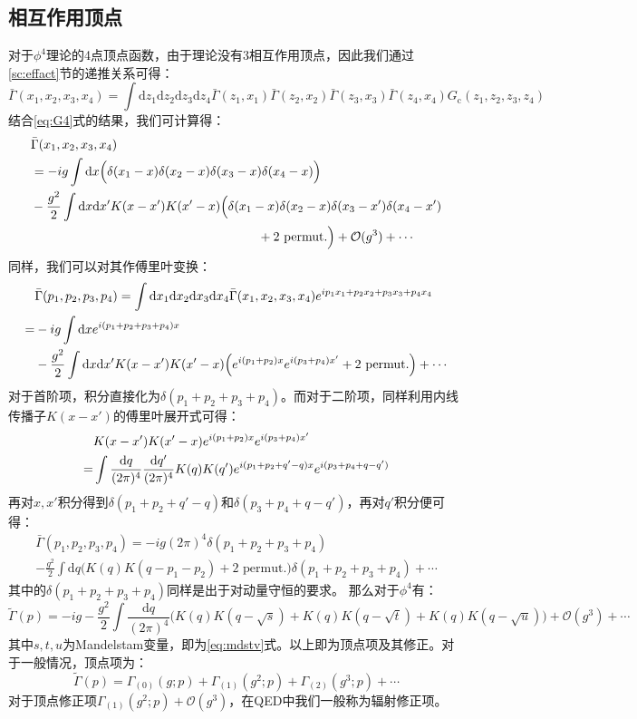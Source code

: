 \subsection{相互作用顶点}
对于$\phi^4$理论的4点顶点函数，由于理论没有3相互作用顶点，因此我们通过\ref{sc:effact}节的递推关系可得：
\begin{equation}
\bar{\Gamma}(x_1,x_2,x_3,x_4)=\int\mathrm{d}z_1\mathrm{d}z_2\mathrm{d}z_3\mathrm{d}z_4\bar{\Gamma}(z_1,x_1)\bar{\Gamma}(z_2,x_2)\bar{\Gamma}(z_3,x_3)\bar{\Gamma}(z_4,x_4)G_{\text{c}}(z_1,z_2,z_3,z_4)
\end{equation}
结合\ref{eq:G4}式的结果，我们可计算得：
\begin{align}
&\bar{\Gamma}(x_1,x_2,x_3,x_4)\notag\\
&=-ig\int\mathrm{d}x\Big(\delta(x_1-x)\delta(x_2-x)\delta(x_3-x)\delta(x_4-x)\Big) \notag\\
&-\frac{g^2}{2}\int\mathrm{d}x\mathrm{d}x'K(x-x')K(x'-x)\Big(\delta(x_1-x)\delta(x_2-x)\delta(x_3-x')\delta(x_4-x')\notag\\
&\hspace{6.3cm}+\text{2 permut.}\Big)+\mathcal{O}(g^3)+\cdots
\end{align}
同样，我们可以对其作傅里叶变换：
\begin{align}
&\bar{\Gamma}(p_1,p_2,p_3,p_4)=\int\mathrm{d}x_1\mathrm{d}x_2\mathrm{d}x_3\mathrm{d}x_4 \bar{\Gamma}(x_1,x_2,x_3,x_4)e^{ip_1x_1+p_2x_2+p_3x_3+p_4x_4}\notag\\
=&-ig\int\mathrm{d}x e^{i(p_1+p_2+p_3+p_4)x}\notag\\
&-\frac{g^2}{2}\int\mathrm{d}x\mathrm{d}x'K(x-x')K(x'-x)\Big(e^{i(p_1+p_2)x}e^{i(p_3+p_4)x'}+\text{2 permut.}\Big)+\cdots
\end{align}
对于首阶项，积分直接化为$\delta(p_1+p_2+p_3+p_4)$。而对于二阶项，同样利用内线传播子$K(x-x')$的傅里叶展开式可得：
\begin{align}
&K(x-x')K(x'-x)e^{i(p_1+p_2)x}e^{i(p_3+p_4)x'}\notag\\
=&\int\frac{\mathrm{d}q}{(2\pi)^4}\frac{\mathrm{d}q'}{(2\pi)^4}K(q)K(q')e^{i(p_1+p_2+q'-q)x}e^{i(p_3+p_4+q-q')}
\end{align}
再对$x,x'$积分得到$\delta(p_1+p_2+q'-q)$和$\delta(p_3+p_4+q-q')$，再对$q'$积分便可得：
\begin{multline}
\bar{\Gamma}(p_1,p_2,p_3,p_4)=-ig(2\pi)^4\delta(p_1+p_2+p_3+p_4)\\
-\frac{g^2}{2}\int\mathrm{d}q\Big(K(q)K(q-p_1-p_2)+\text{2 permut.}\Big)\delta(p_1+p_2+p_3+p_4)+\cdots
\end{multline}
其中的$\delta(p_1+p_2+p_3+p_4)$同样是出于对动量守恒的要求。
那么对于$\phi^4$有：
\begin{equation}
\tilde{\Gamma}(p)=-ig-\frac{g^2}{2}\int\frac{\mathrm{d}q}{(2\pi)^4}\Big(K(q)K(q-\sqrt{s})+K(q)K(q-\sqrt{t})+K(q)K(q-\sqrt{u})\Big)+\mathcal{O}(g^3)+\cdots
\end{equation}
其中$s,t,u$为Mandelstam变量，即为\ref{eq:mdstv}式。以上即为顶点项及其修正。对于一般情况，顶点项为：
\begin{equation}
\tilde{\Gamma}(p)=\Gamma_{(0)}(g;p)+\Gamma_{(1)}(g^2;p)+\Gamma_{(2)}(g^3;p)+\cdots
\end{equation}
对于顶点修正项$\Gamma_{(1)}(g^2;p)+\mathcal{O}(g^3)$，在QED中我们一般称为辐射修正项。

